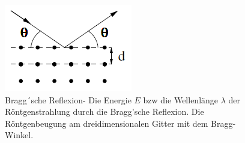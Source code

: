 \begin{figure}[H]
    \centering
    \includegraphics{Bragg1.png}
    \caption{Bragg´sche Reflexion- Die Energie $E$ bzw die Wellenlänge $\lambda$ der Röntgenstrahlung durch die Bragg’sche Reflexion. Die Röntgenbeugung am dreidimensionalen Gitter mit dem Bragg-Winkel\protect\cite{AL}.}
    \label{fig:Bragg1}
\end{figure}


\label{sec:Theorie}

